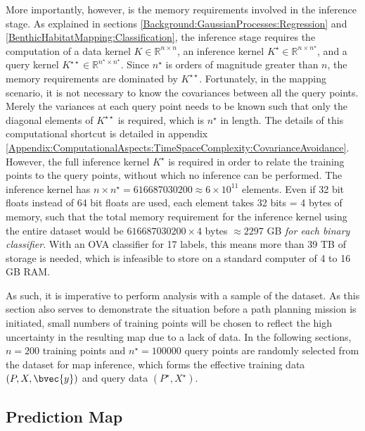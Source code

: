 			More importantly, however, is the memory requirements involved in the inference stage. As explained in sections \ref{Background:GaussianProcesses:Regression} and \ref{BenthicHabitatMapping:Classification}, the inference stage requires the computation of a data kernel $K \in \mathbb{R}^{n \times n}$, an inference kernel $K^{\star} \in \mathbb{R}^{n \times n^{\star}}$, and a query kernel $K^{\star \star} \in \mathbb{R}^{n^{\star} \times n^{\star}}$. Since $n^{\star}$ is orders of magnitude greater than $n$, the memory requirements are dominated by $K^{\star \star}$. Fortunately, in the mapping scenario, it is not necessary to know the covariances between all the query points. Merely the variances at each query point needs to be known such that only the diagonal elements of $K^{\star \star}$ is required, which is $n^{\star}$ in length. The details of this computational shortcut is detailed in appendix \ref{Appendix:ComputationalAspects:TimeSpaceComplexity:CovarianceAvoidance}. However, the full inference kernel $K^{\star}$ is required in order to relate the training points to the query points, without which no inference can be performed. The inference kernel has $n \times n^{\star} = 616687030200 \approx 6 \times 10^{11}$ elements. Even if 32 bit floats instead of 64 bit floats are used, each element takes 32 bits = 4 bytes of memory, such that the total memory requirement for the inference kernel using the entire dataset would be $616687030200 \times 4$ bytes $\approx 2297$ GB \textit{for each binary classifier}. With an OVA classifier for 17 labels, this means more than 39 TB of storage is needed, which is infeasible to store on a standard computer of 4 to 16 GB RAM.
			
			As such, it is imperative to perform analysis with a sample of the dataset. As this section also serves to demonstrate the situation before a path planning mission is initiated, small numbers of training points will be chosen to reflect the high uncertainty in the resulting map due to a lack of data. In the following sections, $n = 200$ training points and $n^{\star} = 100000$ query points are randomly selected from the dataset for map inference, which forms the effective training data $(P, X, \bvec{y})$ and query data $(P^{\star}, X^{\star})$.
			
		\subsection{Prediction Map}
		\label{BenthicHabitatMapping:ScottReef:Maps}

